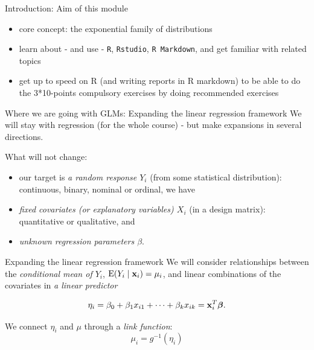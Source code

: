 \documentclass[
  ignorenonframetext,
]{beamer}
\providecommand{\tightlist}{%
  \setlength{\itemsep}{0pt}\setlength{\parskip}{0pt}}
\begin{document}
\begin{frame}[fragile]{Introduction: Aim of this module}
\label{introduction-aim-of-this-module-1}
\begin{itemize}
\tightlist
\item
  core concept: the exponential family of distributions
\item
  learn about - and use - \texttt{R}, \texttt{Rstudio},
  \texttt{R\ Markdown}, and get familiar with related topics
\item
  get up to speed on R (and writing reports in R markdown) to be able to
  do the 3*10-points compulsory exercises by doing recommended exercises
\end{itemize}
\end{frame}

\begin{frame}
\begin{block}{Where we are going with GLMs: Expanding the linear
regression framework}
\label{where-we-are-going-with-glms-expanding-the-linear-regression-framework}
We will stay with regression (for the whole course) - but make
expansions in several directions.

What will not change:

\begin{itemize}
\item
  our target is \emph{a random response \(Y_i\)} (from some statistical
  distribution): continuous, binary, nominal or ordinal, we have
\item
  \emph{fixed covariates (or explanatory variables) \(X_i\)} (in a
  design matrix): quantitative or qualitative, and
\item
  \emph{unknown regression parameters \(\beta\)}.
\end{itemize}
\end{block}
\end{frame}

\begin{frame}
\begin{block}{Expanding the linear regression framework}
\label{expanding-the-linear-regression-framework}
We will consider relationships between the \emph{conditional mean of
\(Y_i\)}, \(\text{E}(Y_i\mid {\bf x}_i)=\mu_i\), and linear combinations
of the covariates in \emph{a linear predictor}

\[
\eta_i=\beta_0+\beta_1 x_{i1}+\cdots +\beta_k x_{ik}={\bf x}_i^T \boldsymbol{\beta}.
\]

We connect \(\eta_i\) and \(\mu\) through a \emph{link function}:
\[\mu_i = g^{-1}(\eta_i)\]
\end{block}
\end{frame}
\end{document}
